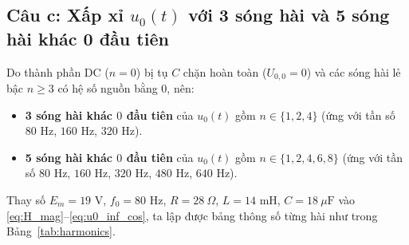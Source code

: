 \subsection{Câu c: Xấp xỉ \texorpdfstring{$u_0(t)$}{u0(t)} với 3 sóng hài và 5 sóng hài khác 0 đầu tiên}

Do thành phần DC ($n=0$) bị tụ $C$ chặn hoàn toàn ($U_{0,0} = 0$) và các sóng hài lẻ bậc $n \ge 3$ có hệ số nguồn bằng $0$, nên:
\begin{itemize}
    \item \textbf{3 sóng hài khác $0$ đầu tiên} của $u_0(t)$ gồm $n \in \{1, 2, 4\}$ (ứng với tần số $80\text{ Hz}$, $160\text{ Hz}$, $320\text{ Hz}$).
    \item \textbf{5 sóng hài khác $0$ đầu tiên} của $u_0(t)$ gồm $n \in \{1, 2, 4, 6, 8\}$ (ứng với tần số $80\text{ Hz}$, $160\text{ Hz}$, $320\text{ Hz}$, $480\text{ Hz}$, $640\text{ Hz}$).
\end{itemize}

Thay số $E_m = 19\text{ V}$, $f_0 = 80\text{ Hz}$, $R = 28\ \Omega$, $L = 14\text{ mH}$, $C = 18\ \mu\text{F}$ vào \eqref{eq:H_mag}--\eqref{eq:u0_inf_cos}, ta lập được bảng thông số từng hài như trong Bảng~\ref{tab:harmonics}.

